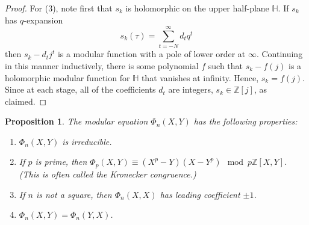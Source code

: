 \documentclass{amsart}
\newtheorem{prop}[thm]{Proposition}
\theoremstyle{definition}
\theoremstyle{remark}
\numberwithin{equation}{section}
\newcommand{\bbH}{\mathbb H}
\newcommand{\bbZ}{\mathbb Z}
\begin{document}
\begin{proof}
For (3), note first that $s_{k}$ is holomorphic on the upper half-plane $\bbH$. If $s_{k}$ has $q$-expansion
\[
s_{k}(\tau) = \sum_{t = -N}^{\infty} d_{t} q^t
\]
then $s_{k} - d_t j^t$ is a modular function with a pole of lower order at $\infty$. Continuing in this manner inductively, there is some polynomial $f$ such that $s_{k} - f(j)$ is a holomorphic modular function for $\bbH$ that vanishes at infinity. Hence, $s_{k} = f(j)$. Since at each stage, all of the coefficients $d_{t}$ are integers, $s_{k} \in \bbZ[j]$, as claimed.
\end{proof} 


\begin{prop} \label{prop:PropertiesOfPhiN}
The modular equation $\Phi_{n}(X,Y)$ has the following properties:
\begin{enumerate}
\item $\Phi_{n}(X,Y)$ is irreducible.
\item If $p$ is prime, then $\Phi_{p}(X,Y) \equiv (X^p - Y)(X - Y^{p}) \mod p\bbZ[X,Y]$. (This is often called the \emph{Kronecker congruence}.) %
\item If $n$ is not a square, then $\Phi_{n}(X,X)$ has leading coefficient $\pm 1$.
\item $\Phi_{n}(X,Y) = \Phi_{n}(Y,X)$.
\end{enumerate}
\end{prop}
\end{document}

